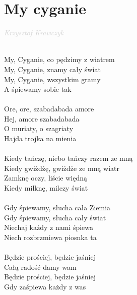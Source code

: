 \documentclass[a5paper, 10pt]{book}
\begin{document}
\newpage
\section{My cyganie}\textcolor{lightgray}{\textit{Krzysztof Krawczyk}}\\~\\
\begin{minipage}[t]{0.7\textwidth}
  My, Cyganie, co pędzimy z wiatrem\\
  My, Cyganie, znamy cały świat\\
  My, Cyganie, wszystkim gramy\\
  A śpiewamy sobie tak\\
  \\
  \hspace*{6mm}Ore, ore, szabadabada amore\\
  \hspace*{6mm}Hej, amore szabadabada\\
  \hspace*{6mm}O muriaty, o szagriaty\\
  \hspace*{6mm}Hajda trojka na mienia\\
  \\
  Kiedy tańczę, niebo tańczy razem ze mną\\
  Kiedy gwiżdżę, gwiżdże ze mną wiatr\\
  Zamknę oczy, liście więdną\\
  Kiedy milknę, milczy świat\\
  \\
  Gdy śpiewamy, słucha cała Ziemia\\
  Gdy śpiewamy, słucha cały świat\\
  Niechaj każdy z nami śpiewa\\
  Niech rozbrzmiewa piosnka ta\\
  \\
  Będzie prościej, będzie jaśniej\\
  Całą radość damy wam\\
  Będzie prościej, będzie jaśniej\\
  Gdy zaśpiewa każdy z was\\
\end{minipage}
\end{document}
